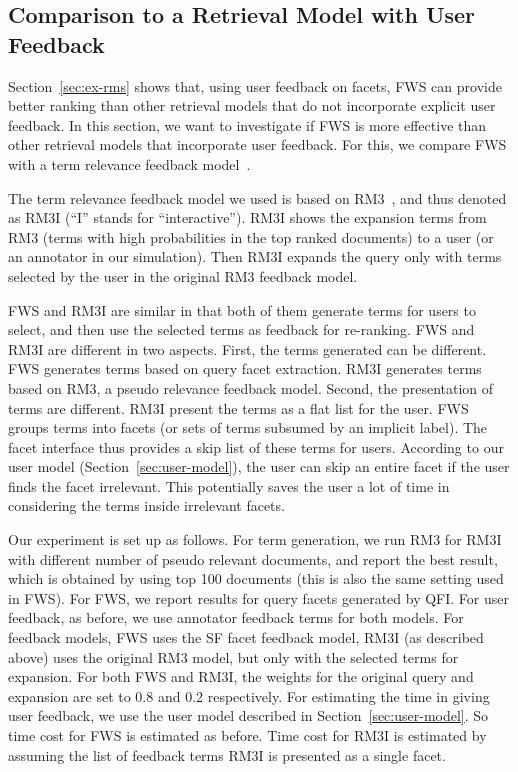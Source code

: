\subsection{Comparison to a Retrieval Model with User Feedback}
Section~\ref{sec:ex-rms} shows that, using user feedback on facets, FWS can provide better ranking than other retrieval models that do not incorporate explicit user feedback. In this section, we want to investigate if FWS is more effective than other retrieval models that incorporate user feedback. For this, we compare FWS with a term relevance feedback model~\cite{koenemann1996case,tan2007term}.

The term relevance feedback model we used is based on RM3~\cite{abdul2004umass,lavrenko2001relevance}, and thus denoted as RM3I (``I'' stands for ``interactive''). RM3I shows the expansion terms from RM3 (terms with high probabilities in the top ranked documents) to a user (or an annotator in our simulation). Then RM3I expands the query only with terms selected by the user in the original RM3 feedback model.

FWS and RM3I are similar in that both of them generate terms for users to select, and then use the selected terms as feedback for re-ranking.  
FWS and RM3I are different in two aspects. First, the terms generated can be different. FWS generates terms based on query facet extraction. RM3I generates terms based on RM3, a pseudo relevance feedback model. Second, the presentation of terms are different. RM3I present the terms as a flat list for the user. FWS groups terms into facets (or sets of terms subsumed by an implicit label). The facet interface thus provides a skip list of these terms for users. According to our user model (Section~\ref{sec:user-model}), the user can skip an entire facet if the user finds the facet irrelevant. This potentially saves the user a lot of time in considering the terms inside irrelevant facets.

Our experiment is set up as follows. For term generation, we run RM3 for RM3I with different number of pseudo relevant documents, and report the best result, which is obtained by using top 100 documents (this is also the same setting used in FWS). For FWS, we report results for query facets generated by QFI. For user feedback, as before, we use annotator feedback terms for both models. For feedback models, FWS uses the SF facet feedback model, RM3I (as described above) uses the original RM3 model, but only with the selected terms for expansion. For both FWS and RM3I, the weights for the original query and expansion are set to 0.8 and 0.2 respectively. For estimating the time in giving user feedback, we use the user model described in Section~\ref{sec:user-model}. So time cost for FWS is estimated as before. Time cost for RM3I is estimated by assuming the list of feedback terms RM3I is presented as a single facet.

